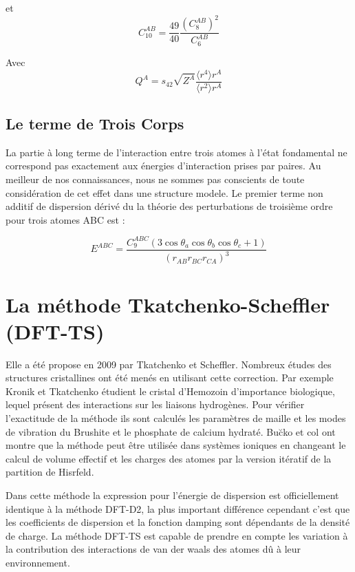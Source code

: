 	et \begin{equation}
	C_{10}^{AB} =\frac{49}{40} \frac{(C_{8}^{AB})^{2}}{C_{6}^{AB}}
	\end{equation}
	
	Avec
	\begin{equation}
	Q^{A} = s_{42}\sqrt{Z^{A}} \frac{\langle r^{4}\rangle r^{A}}{\langle r^{2}\rangle r^{A}}
	\end{equation}
	
	\bigskip
	\subsection{Le terme de Trois Corps}
	\bigskip
	
	La partie à long terme de l'interaction entre trois atomes à l'état fondamental ne correspond pas exactement aux énergies d'interaction prises par paires. Au meilleur de nos connaissances, nous ne sommes pas conscients de toute considération de cet effet dans une structure modele. Le premier terme non additif de dispersion dérivé du
	la théorie des perturbations de troisième ordre pour trois atomes ABC est :
	
	\begin{equation}
	E^{ABC} = \frac{C_{9}^{ABC}(3\cos\theta_{a}\cos\theta_{b}\cos\theta_{c}+ 1)}{(r_{AB} r_{BC} r_{CA})^{3}}
	\end{equation}
	
	\bigskip
	\section{La méthode Tkatchenko-Scheffler (DFT-TS)}
	
	Elle a été propose en 2009 par Tkatchenko et Scheffler\cite{tkatchenko2009accurate}. Nombreux études des structures cristallines ont été menés en utilisant cette correction. Par exemple Kronik et Tkatchenko\cite{kronik2014understanding} étudient le cristal d'Hemozoin d'importance biologique, lequel présent des interactions sur les liaisons hydrogènes. Pour vérifier l'exactitude de la méthode ils sont calculés les paramètres de maille et les modes de vibration du Brushite et le phosphate de calcium hydraté. Bu\u{c}ko et col\cite{buvcko2014extending} ont montre que la méthode peut être utilisée dans systèmes ioniques en changeant le calcul de volume effectif et les charges des atomes par la version itératif de la partition de Hisrfeld.
	
	Dans cette méthode la expression pour l'énergie de dispersion est officiellement identique à la méthode DFT-D2, la plus important différence cependant c'est que les coefficients de dispersion et la fonction damping sont dépendants de la densité de charge. La méthode DFT-TS est capable de prendre en compte les variation à la contribution des interactions de van der waals des atomes dû à leur environnement. 
	
